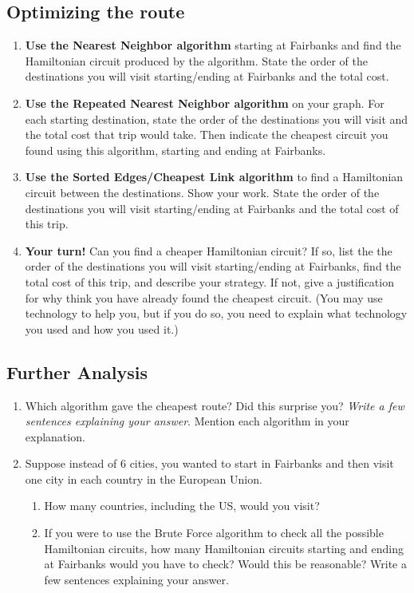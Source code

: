 \documentclass[12pt]{article}
\newcommand{\be}{\begin{enumerate}}
\newcommand{\ee}{\end{enumerate}}
\begin{document}
\subsection*{Optimizing the route}

\begin{enumerate}
  \item {\bf Use the Nearest Neighbor algorithm} starting at
      Fairbanks and find the Hamiltonian circuit produced by the algorithm. State the order of the destinations you will
    visit starting/ending at Fairbanks and the total cost.
  \item {\bf Use the Repeated Nearest Neighbor algorithm} on your graph. 
     For each starting
    destination, state the order
    of the destinations you will visit and the total cost
    that trip would take. Then indicate the cheapest circuit you found using this algorithm, starting
    and ending at Fairbanks.
  \item {\bf Use the Sorted Edges/Cheapest Link algorithm} to find a
      Hamiltonian circuit between the destinations.
    Show your work. State the order of the destinations you will visit
    starting/ending at Fairbanks and the total cost of this trip.
    \item {\bf Your turn!} Can you find a cheaper Hamiltonian circuit? If so, list the the order of the destinations you will visit
    starting/ending at Fairbanks, find the total cost of this trip, and describe your strategy. If not, give a justification for why think you have already found the cheapest circuit. (You may use technology to help you, but if you do so, you need to explain what technology you used and how you used it.)
\end{enumerate}

\subsection*{Further Analysis}
\begin{enumerate}
\item Which algorithm gave the cheapest route? Did this surprise you?
  \emph{Write a few sentences
    explaining your answer}. Mention each algorithm in your
  explanation.
  \item Suppose instead of 6 cities, you wanted to start in Fairbanks and then visit one city in each country in the European Union.
  \be
  \item How many countries, including the US, would you visit?
  \item If you were to use the Brute Force algorithm to check all the
    possible Hamiltonian
    circuits, how many Hamiltonian circuits starting and ending at
    Fairbanks would you have
    to check? Would this be reasonable? Write a few sentences
      explaining your answer.
      \ee
\end{enumerate}
\end{document}
